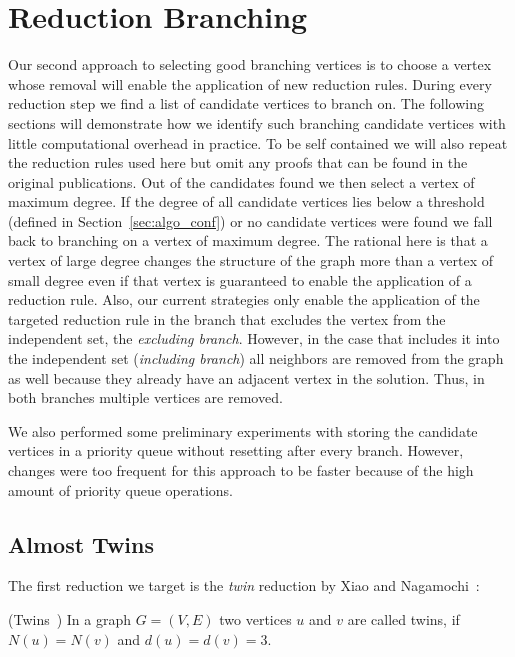 \documentclass[a4paper,UKenglish,cleveref, autoref, thm-restate]{lipics-v2021}
\begin{document}
\section{Reduction Branching}\label{sec:reduction_branching}
Our second approach to selecting good branching vertices is to choose a vertex
whose removal will enable the application of new reduction rules. During every
reduction step we find a list of candidate vertices to branch on. The following
sections will demonstrate how we identify such branching candidate vertices with little
computational overhead in practice. To be self contained we will also repeat the reduction
rules used here but omit any proofs that can be found in the original
publications. Out of the candidates found we then select a vertex of
maximum degree. If the degree of all candidate vertices lies below a threshold
(defined in Section~\ref{sec:algo_conf}) or no candidate vertices were found we fall back to branching on a vertex
of maximum degree. The rational here is that a vertex of large degree changes
the structure of the graph more than a vertex of small degree even if that
vertex is guaranteed to enable the application of a reduction rule. Also, our
current strategies only enable the application of the targeted reduction rule in
the branch that excludes the vertex from the independent set, the
\emph{excluding branch}. However, in the
case that includes it into the independent set (\emph{including branch}) all neighbors are removed from
the graph as well because they already have an adjacent vertex in the solution.
Thus, in both branches multiple vertices are removed.

We also performed some preliminary experiments with storing the candidate vertices in
a priority queue without resetting after every branch.
However, changes were too frequent for this approach to be faster because of
the high amount of priority queue operations.

\subsection{Almost Twins}

The first reduction we target is the \emph{twin} reduction by Xiao and Nagamochi~\cite{XiaoUnconfined}:

\begin{definition}(Twins~\cite{XiaoUnconfined})
  In a graph $G=(V,E)$ two vertices $u$ and $v$ are called twins, if $N(u) = N(v)$ and $d(u) = d(v) = 3$.
\end{definition}
\end{document}
